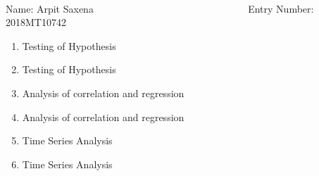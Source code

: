 \documentclass[12pt, oneside]{article}
\begin{document}
\setlength{\textheight}{8.5in}
\\





\vskip 0.5cm

\noindent Name: Arpit Saxena ~~~  ~~~~~ ~~~~ ~~~~~~~~~~~~~~~~ Entry Number: 2018MT10742 ~~~~~~~~~~~



\vskip 0.5cm



\begin{enumerate}
	



\item	Testing of Hypothesis


\item	 Testing of Hypothesis


\item	Analysis of correlation and regression 



\item	Analysis of correlation and regression 


\item	Time Series Analysis


\item	Time Series Analysis


\end{enumerate}
\end{document}
